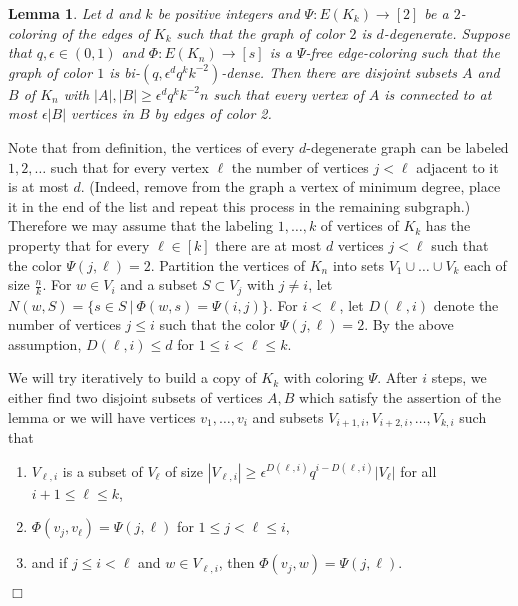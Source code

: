 \documentclass[11pt]{article}
\newenvironment{proof}
      {\medskip\noindent{\bf Proof.}\hspace{1mm}}
      {\hfill$\Box$\medskip}
\newtheorem{lemma}[theorem]{Lemma}
\begin{document}
\begin{lemma}\label{lemmaerdoshajnal2}
Let $d$ and $k$ be positive integers and $\Psi:E(K_k) \rightarrow
[2]$ be a $2$-coloring of the edges of $K_k$ such that the graph of
color $2$ is $d$-degenerate. Suppose that $q,\epsilon \in (0,1)$ and
$\Phi:E(K_n) \rightarrow [s]$ is a $\Psi$-free edge-coloring such
that the graph of color $1$ is
bi-$(q,\epsilon^dq^{k}k^{-2})$-dense. Then there are disjoint
subsets $A$ and $B$ of $K_n$ with $|A|,|B| \geq
\epsilon^{d}q^{k} k^{-2}n$ such that every vertex of $A$ is connected to at most
$\epsilon|B|$ vertices in $B$ by edges of color 2.
\end{lemma}
\begin{proof}
Note that from definition, the vertices of every $d$-degenerate
graph can be labeled $1,2, \ldots$ such that for every vertex $\ell$
the number of vertices $j<\ell$ adjacent to it is at most $d$.
(Indeed, remove from the graph a vertex of minimum degree, place it
in the end of the list and repeat this process in the remaining
subgraph.) Therefore we may assume that the labeling $1, \ldots, k$
of vertices of $K_k$ has the property that for every $\ell \in [k]$
there are at most $d$ vertices $j <\ell$ such that the color
$\Psi(j,\ell)=2$. Partition the vertices of $K_n$ into sets $V_1
\cup \ldots \cup V_{k}$ each of size $\frac{n}{k}$. For $w \in V_i$
and a subset $S \subset V_j$ with $j \not = i$, let $N(w,S)=\{s \in
S ~|~ \Phi(w,s)=\Psi(i,j)\}.$ For $i<\ell $, let $D(\ell,i)$ denote
the number of vertices $j \leq i$ such that the color
$\Psi(j,\ell)=2$. By the above assumption, $D(\ell,i) \leq d$ for $1
\leq i < \ell \leq k$.

We will try iteratively to build a copy of $K_{k}$ with coloring
$\Psi$. After $i$ steps, we either find two disjoint subsets of vertices $A, B$ which satisfy the assertion of the lemma or we
will have vertices $v_1,\ldots,v_{i}$ and
subsets $V_{i+1,i},V_{i+2,i},\ldots,V_{k,i}$ such that
\begin{enumerate}
\item $V_{\ell,i}$ is a subset of $V_\ell$ of size $|V_{\ell,i}| \geq \epsilon^{D(\ell,i)}q^{i-D(\ell,i)}|V_{\ell}|$ for all $i+1 \leq
\ell \leq k$,
\item $\Phi(v_j,v_{\ell})=\Psi(j,\ell)$ for $1 \leq j<\ell \leq i$,
\item and if $j \leq i< \ell$ and $w \in V_{\ell,i}$, then
$\Phi(v_j,w)=\Psi(j,\ell)$.
\end{enumerate}


\end{proof}
\end{document}

